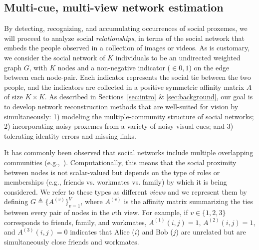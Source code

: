 
\subsection{Multi-cue, multi-view network estimation}
\label{sec:vis2net}
\vspace{-5pt}

By detecting, recognizing, and accumulating occurrences of social proxemes, we will proceed to analyze social \emph{relationships}, in terms of the social network that embeds the people observed in a collection of images or videos. As is customary, we consider the social network of $K$ individuals to be an undirected weighted graph $G$, with $K$ nodes and a non-negative indicator ($\in {0,1}$) on the edge between each node-pair. Each indicator represents the social tie between the two people, and the indicators are collected in a positive symmetric affinity matrix $A$ of size $K\times K$. As described in Sections~\ref{sec:intro} \& \ref{sec:background}, our goal is to develop network reconstruction methods that are well-suited for vision by simultaneously: 1) modeling the multiple-community structure of social networks; 2) incorporating noisy proxemes from a variety of noisy visual cues; and 3) tolerating identity errors and missing links.

It has commonly been observed that social networks include multiple overlapping communities (e.g.,~\cite{AiroldiBFX08,Kim12}). Computationally, this means that the social proximity between nodes is not scalar-valued but depends on the type of roles or memberships (e.g., friends vs. workmates vs. family) by which it is being considered. We refer to these types as different \emph{views} and we represent them by defining $G\triangleq\{A^{(v)}\}_{v=1}^{V}$, where $A^{(v)}$ is the affinity matrix summarizing the ties between every pair of nodes in the $v$th view. For example, if $v\in\{1,2,3\}$ corresponds to friends, family, and workmates,  $A^{(1)}(i,j)=1$, $A^{(2)}(i,j)=1$, and $A^{(3)}(i,j)=0$ indicates that Alice ($i$) and Bob ($j$) are unrelated but are simultaneously close friends and workmates. 

